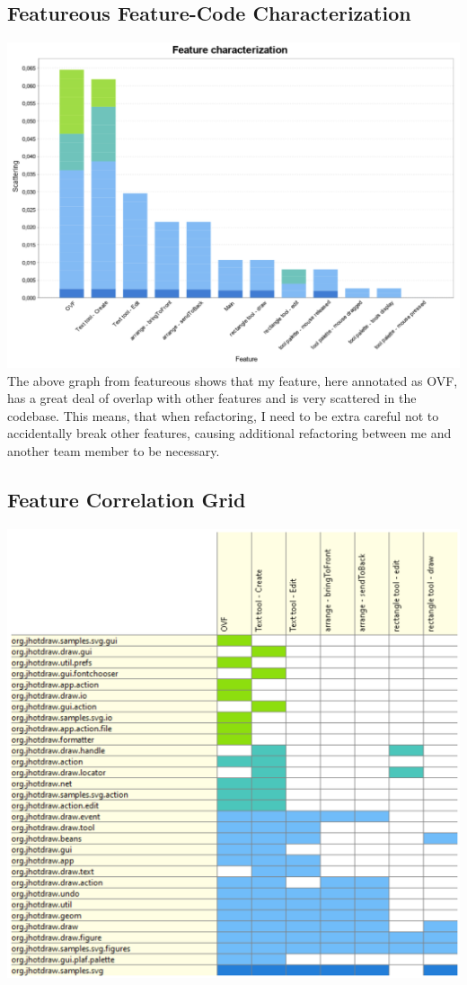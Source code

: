 \subsection{Featureous Feature-Code Characterization}
\includegraphics[width=\textwidth]{Images/featurecharacterization.png}
The above graph from featureous shows that my feature, here annotated as OVF, has a great deal of overlap with other features and is very scattered in the codebase. This means, that when refactoring, I need to be extra careful not to accidentally break other features, causing additional refactoring between me and another team member to be necessary.

\subsection{Feature Correlation Grid}
\includegraphics[width=\textwidth]{Images/featureousgrid.png}

